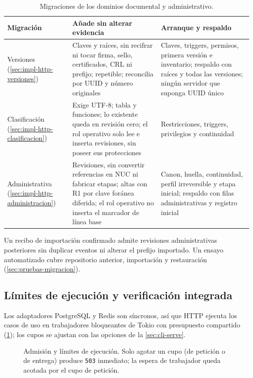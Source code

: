 \begin{table}[t]
  \centering
  \caption{Migraciones de los dominios documental y administrativo.}
  \label{tab:impl-http-migraciones-dominio}
  \begin{tabularx}{\linewidth}{@{}L{2.75cm} X X@{}}
    \toprule
    \textbf{Migración} & \textbf{Añade sin alterar evidencia} & \textbf{Arranque y respaldo} \\
    \midrule
    Versiones (\ref{sec:impl-http-versiones}) & Claves y raíces, sin recifrar ni tocar firma, sello, certificados, CRL ni prefijo; repetible; reconcilia por UUID y número originales & Claves, triggers, permisos, primera versión e inventario; respaldo con raíces y todas las versiones; ningún servidor que suponga UUID único \\
    Clasificación (\ref{sec:impl-http-clasificacion}) & Exige UTF-8; tabla y funciones; lo existente queda en revisión cero; el rol operativo solo lee e inserta revisiones, sin poseer sus protecciones & Restricciones, triggers, privilegios y continuidad \\
    Administrativa (\ref{sec:impl-http-administracion}) & Revisiones, sin convertir referencias en NUC ni fabricar etapas; altas con R1 por clave foránea diferida; el rol operativo no inserta el marcador de línea base & Canon, huella, continuidad, perfil irreversible y etapa inicial; respaldo con filas administrativas y registro inicial \\
    \bottomrule
  \end{tabularx}
\end{table}

Un recibo de importación confirmado admite revisiones administrativas posteriores sin duplicar eventos ni alterar el prefijo importado. Un ensayo automatizado cubre repositorio anterior, importación y restauración (\cref{sec:pruebas-migracion}).

\subsection{Límites de ejecución y verificación integrada}\label{sec:impl-http-limites}

Los adaptadores PostgreSQL y Redis son síncronos, así que HTTP ejecuta los casos de uso en trabajadores bloqueantes de Tokio con presupuesto compartido (\cref{fig:impl-admision}); los cupos se ajustan con las opciones de la \cref{sec:cli-serve}.

\begin{figure}[t]
  \centering
  
  \caption{Admisión y límites de ejecución. Solo agotar un cupo (de petición o de entrega) produce \texttt{503} inmediato; la espera de trabajador queda acotada por el cupo de petición.}
  \label{fig:impl-admision}
\end{figure}

